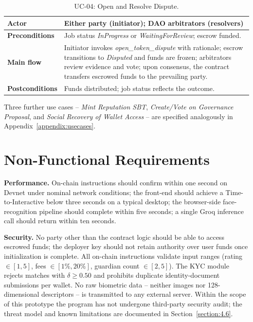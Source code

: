 \begin{table}[H]
\centering
\caption{UC-04: Open and Resolve Dispute.}
\label{table:uc04}
\small
\begin{tabular}{|l|p{9.5cm}|}
\hline
\textbf{Actor} & Either party (initiator); DAO arbitrators (resolvers) \\ \hline
\textbf{Preconditions} & Job status \emph{InProgress} or \emph{WaitingForReview}; escrow funded. \\ \hline
\textbf{Main flow} & Initiator invokes \emph{open\_token\_dispute} with rationale; escrow transitions to \emph{Disputed} and funds are frozen; arbitrators review evidence and vote; upon consensus, the contract transfers escrowed funds to the prevailing party. \\ \hline
\textbf{Postconditions} & Funds distributed; job status reflects the outcome. \\ \hline
\end{tabular}
\end{table}

Three further use cases -- \textit{Mint Reputation SBT}, \textit{Create/Vote on Governance Proposal}, and \textit{Social Recovery of Wallet Access} -- are specified analogously in Appendix~\ref{appendix:usecases}.

\section{Non-Functional Requirements}
\label{section:2.4}

\textbf{Performance.} On-chain instructions should confirm within one second on Devnet under nominal network conditions; the front-end should achieve a Time-to-Interactive below three seconds on a typical desktop; the browser-side face-recognition pipeline should complete within five seconds; a single Groq inference call should return within ten seconds.

\textbf{Security.} No party other than the contract logic should be able to access escrowed funds; the deployer key should not retain authority over user funds once initialization is complete. All on-chain instructions validate input ranges (rating $\in [1,5]$, fees $\in [1\%, 20\%]$, guardian count $\in [2,5]$). The KYC module rejects matches with $\delta \geq 0.50$ and prohibits duplicate identity-document submissions per wallet. No raw biometric data -- neither images nor 128-dimensional descriptors -- is transmitted to any external server. Within the scope of this prototype the program has not undergone third-party security audit; the threat model and known limitations are documented in Section~\ref{section:4.6}.

